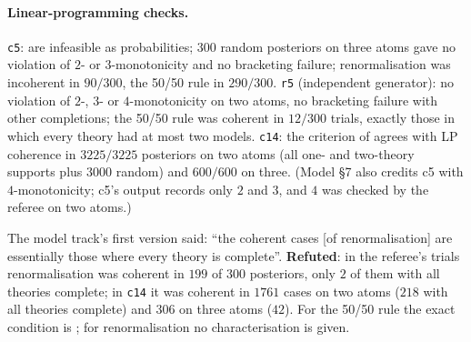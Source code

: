 \paragraph{Linear-programming checks.} \texttt{c5}:  are infeasible as probabilities; $300$ random posteriors on three atoms gave no violation of $2$- or $3$-monotonicity and no bracketing failure; renormalisation was incoherent in $90/300$, the 50/50 rule in $290/300$. \texttt{r5} (independent generator): no violation of $2$-, $3$- or $4$-monotonicity on two atoms, no bracketing failure with other completions; the 50/50 rule was coherent in $12/300$ trials, exactly those in which every theory had at most two models. \texttt{c14}: the criterion of  agrees with LP coherence in $3225/3225$ posteriors on two atoms (all one- and two-theory supports plus $3000$ random) and $600/600$ on three. (Model \S7 also credits c5 with $4$-monotonicity; c5's output records only $2$ and $3$, and $4$ was checked by the referee on two atoms.)

\begin{remark}\label{rem:sound:completeref}
The model track's first version said: ``the coherent cases [of renormalisation] are essentially those where every theory is complete''. \textbf{Refuted}: in the referee's trials renormalisation was coherent in $199$ of $300$ posteriors, only $2$ of them with all theories complete; in \texttt{c14} it was coherent in $1761$ cases on two atoms ($218$ with all theories complete) and $306$ on three atoms ($42$). For the 50/50 rule the exact condition is ; for renormalisation no characterisation is given.
\end{remark}
